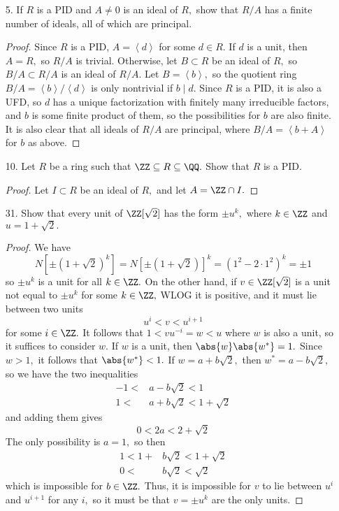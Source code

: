 \documentclass{article}
\begin{document}
\begin{itemize}
	\item[5.] If $R$ is a PID and $A\neq 0$ is an ideal of $R,$ show that $R/A$ has a finite number of ideals, all of which are principal.
		\begin{proof}
			Since $R$ is a PID, $A=\left< d\right>$ for some $d\in R.$ If $d$ is a unit, then $A=R,$ so $R/A$ is trivial. Otherwise, let $B\subset R$ be an ideal of $R,$ so $B/A\subset R/A$ is an ideal of $R/A.$ Let $B=\left< b\right>,$ so the quotient ring $B/A=\left< b\right>/\left< d\right>$ is only nontrivial if $b\mid d.$ Since $R$ is a PID, it is also a UFD, so $d$ has a unique factorization with finitely many irreducible factors, and $b$ is some finite product of them, so the possibilities for $b$ are also finite. It is also clear that all ideals of $R/A$ are principal, where $B/A=\left< b+A\right>$ for $b$ as above.
		\end{proof}

	\item[10.] Let $R$ be a ring such that $\ZZ\subseteq R\subseteq \QQ.$ Show that $R$ is a PID.
		\begin{proof}
			Let $I\subset R$ be an ideal of $R,$ and let $A=\ZZ\cap I.$ 
		\end{proof}

	\item[31.] Show that every unit of $\ZZ[\sqrt{2}]$ has the form $\pm u^k,$ where $k\in\ZZ$ and $u=1+\sqrt{2}.$
		\begin{proof}
			We have 
			\[N\left[ \pm(1+\sqrt{2})^k \right] = N\left[ \pm(1+\sqrt{2}) \right]^k = (1^2-2\cdot1^2)^k = \pm 1\]
			so $\pm u^k$ is a unit for all $k\in\ZZ.$ On the other hand, if $v\in\ZZ[\sqrt{2}]$ is a unit not equal to $\pm u^k$ for some $k\in \ZZ,$ WLOG it is positive, and it must lie between two units
			\[u^i<v<u^{i+1}\]
			for some $i\in\ZZ.$ It follows that $1<vu^{-i}=w<u$ where $w$ is also a unit, so it suffices to consider $w.$ If $w$ is a unit, then $\abs{w}\abs{w^*}=1.$ Since $w>1,$ it follows that $\abs{w^*}<1.$ If $w=a+b\sqrt{2},$ then $w^*=a-b\sqrt{2},$ so we have the two inequalities
			\begin{align*}
				-1 < &a-b\sqrt{2} < 1 \\
				1 < &a+b\sqrt{2} < 1+\sqrt{2}
			\end{align*}
			and adding them gives
			\[0 < 2a < 2+\sqrt{2}\]
			The only possibility is $a=1,$ so then
			\begin{align*}
				1 < 1+&b\sqrt{2} < 1+\sqrt{2} \\
				0 < &b\sqrt{2} < \sqrt{2}
			\end{align*}
			which is impossible for $b\in\ZZ.$ Thus, it is impossible for $v$ to lie between $u^i$ and $u^{i+1}$ for any $i,$ so it must be that $v=\pm u^k$ are the only units.
		\end{proof}
		
\end{itemize}
\end{document}
